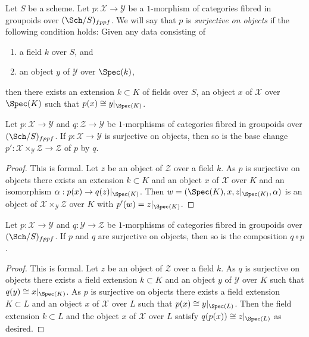 \noindent
Let $S$ be a scheme. Let $p : \mathcal{X} \to \mathcal{Y}$ be a $1$-morphism
of categories fibred in groupoids over $(\Sch/S)_{fppf}$. We will say that
$p$ is {\it surjective on objects} if the following condition holds:
Given any data consisting of
\begin{enumerate}
\item a field $k$ over $S$, and
\item an object $y$ of $\mathcal{Y}$ over $\Spec(k)$,
\end{enumerate}
then there exists an extension $k \subset K$ of fields over $S$, an
object $x$ of $\mathcal{X}$ over $\Spec(K)$
such that $p(x) \cong y|_{\Spec(K)}$.

\begin{lemma}
\label{lemma-base-change-surjective}
Let $p : \mathcal{X} \to \mathcal{Y}$ and $q : \mathcal{Z} \to \mathcal{Y}$
be $1$-morphisms of categories fibred in groupoids over $(\Sch/S)_{fppf}$.
If $p : \mathcal{X} \to \mathcal{Y}$ is surjective on objects, then so
is the base change
$p' : \mathcal{X} \times_\mathcal{Y} \mathcal{Z} \to \mathcal{Z}$
of $p$ by $q$.
\end{lemma}

\begin{proof}
This is formal. Let $z$ be an object of $\mathcal{Z}$ over a field $k$.
As $p$ is surjective on objects there exists an extension $k \subset K$
and an object $x$ of $\mathcal{X}$ over $K$ and an isomorphism
$\alpha : p(x) \to q(z)|_{\Spec(K)}$. Then
$w = (\Spec(K), x, z|_{\Spec(K)}, \alpha)$ is an object of
$\mathcal{X} \times_\mathcal{Y} \mathcal{Z}$ over $K$ with
$p'(w) = z|_{\Spec(K)}$.
\end{proof}

\begin{lemma}
\label{lemma-composition-surjective}
Let $p : \mathcal{X} \to \mathcal{Y}$ and $q : \mathcal{Y} \to \mathcal{Z}$
be $1$-morphisms of categories fibred in groupoids over $(\Sch/S)_{fppf}$.
If $p$ and $q$ are surjective on objects, then so is the composition
$q \circ p$.
\end{lemma}

\begin{proof}
This is formal. Let $z$ be an object of $\mathcal{Z}$ over a field $k$.
As $q$ is surjective on objects there exists a field extension $k \subset K$
and an object $y$ of $\mathcal{Y}$ over $K$ such that
$q(y) \cong x|_{\Spec(K)}$. As $p$ is surjective on objects there
exists a field extension $K \subset L$ and an object $x$ of $\mathcal{X}$
over $L$ such that $p(x) \cong y|_{\Spec(L)}$. Then the field extension
$k \subset L$ and the object $x$ of $\mathcal{X}$ over $L$ satisfy
$q(p(x)) \cong z|_{\Spec(L)}$ as desired.
\end{proof}

